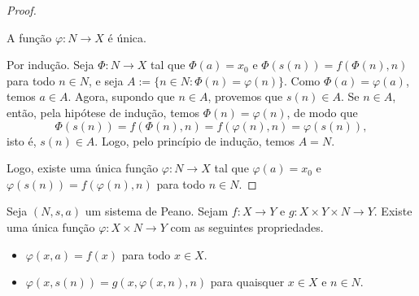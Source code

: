 \begin{proof}
        \begin{claim}
            A função $\varphi: N \to X$ é única.
        \end{claim}
        \begin{midproof}
            Por indução. Seja $\Phi : N \to X$ tal que $\Phi(a) = x_0$ e $\Phi(s(n)) = f(\Phi(n), n)$ para todo $n \in N$, e seja $A := \{ n \in N : \Phi(n) = \varphi(n)\}$. Como $\Phi(a) = \varphi(a)$, temos $a \in A$. Agora, supondo que $n \in A$, provemos que $s(n) \in A$. Se $n \in A$, então, pela hipótese de indução, temos $\Phi(n) = \varphi(n)$, de modo que
                \[
                    \Phi(s(n)) = f(\Phi(n), n) = f(\varphi(n), n) = \varphi(s(n)),
                \]
            isto é, $s(n) \in A$. Logo, pelo princípio de indução, temos $A = N$. \whiteproof
        \end{midproof}
    Logo, existe uma única função $\varphi: N \to X$ tal que $\varphi(a) = x_0$ e $\varphi(s(n)) = f(\varphi(n), n)$ para todo $n \in N$. \blackproof
\end{proof}

\begin{theorem} \label{lema.set:recpar2} 
    Seja $(N,s,a)$ um sistema de Peano. Sejam $f : X \to Y$ e $g : X \times Y \times N \to Y$. Existe uma única função $\varphi : X \times N \to Y$ com as seguintes propriedades.
        \begin{itemize}
            \item $\varphi(x,a) = f(x)$ para todo $x \in X$.
            \item $\varphi(x, s(n)) = g(x,\varphi(x,n),n)$ para quaisquer $x \in X$ e $n \in N$.
        \end{itemize}
\end{theorem}

